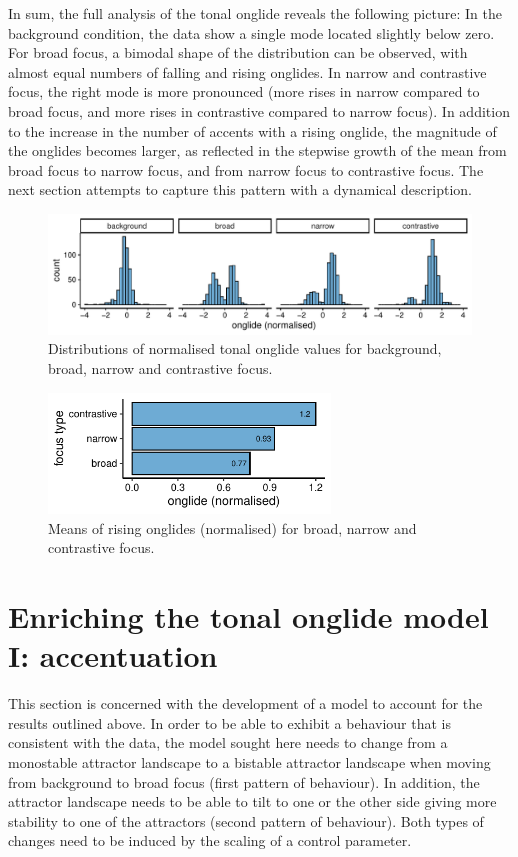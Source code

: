 In sum, the full analysis of the tonal onglide reveals the following picture: In the background condition, the data show a single mode located slightly below zero. For broad focus, a bimodal shape of the distribution can be observed, with almost equal numbers of falling and rising onglides. In narrow and contrastive focus, the right mode is more pronounced (more rises in narrow compared to broad focus, and more rises in contrastive compared to narrow focus). In addition to the increase in the number of accents with a rising onglide, the magnitude of the onglides becomes larger, as reflected in the stepwise growth of the mean from broad focus to narrow focus, and from narrow focus to contrastive focus. The next section attempts to capture this pattern with a dynamical description.

\begin{figure}
\includegraphics[width=\textwidth]{figures/ch7/onglide_norm_distribution_all.pdf}
\caption{Distributions of normalised tonal onglide values for background, broad, narrow and contrastive focus.}
\label{fig:onglide_distributions_across}
\end{figure}

\begin{figure}
\includegraphics[width=7.5cm]{figures/ch7/onglide_norm_rising_means.pdf}
\caption{Means of rising onglides (normalised) for broad, narrow and contrastive focus.}
\label{fig:onglide_means_second_occurence}
\end{figure}

\section{Enriching the tonal onglide model I: accentuation}

This section is concerned with the development of a model to account for the results outlined above. In order to be able to exhibit a behaviour that is consistent with the data, the model sought here needs to change from a monostable attractor landscape to a bistable attractor landscape when moving from background to broad focus (first pattern of behaviour). In addition, the attractor landscape needs to be able to tilt to one or the other side giving more stability to one of the attractors (second pattern of behaviour). Both types of changes need to be induced by the scaling of a control parameter.

